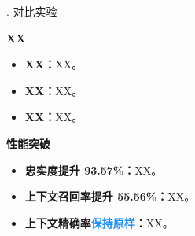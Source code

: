 \begin{frame}
    \tableofcontents[
        sectionstyle=show/shaded,
        subsectionstyle=show/shaded,
        subsubsectionstyle=show/shaded
    ]
\end{frame}

\begin{frame}{\MakeUppercase{}. 对比实验}
    

    \begin{block}{\textbf{XX}}
        \vspace{-0.5em}

        \begin{itemize}
                \small
            \item \textbf{XX：}XX。
            \item \textbf{XX：}XX。
            \item \textbf{XX：}XX。
        \end{itemize}
    \end{block}

    \vspace{-0.5em}

    \begin{block}{\textbf{性能突破}}
        \vspace{-0.5em}

        \begin{itemize}
                \small
            \item \textbf{忠实度\textcolor{Green3}{提升 93.57\%}：}XX。
            \item \textbf{上下文召回率\textcolor{Green3}{提升 55.56\%}：}XX。
            \item \textbf{上下文精确率\textcolor{DodgerBlue}{保持原样}：}XX。
        \end{itemize}
    \end{block}
\end{frame}

